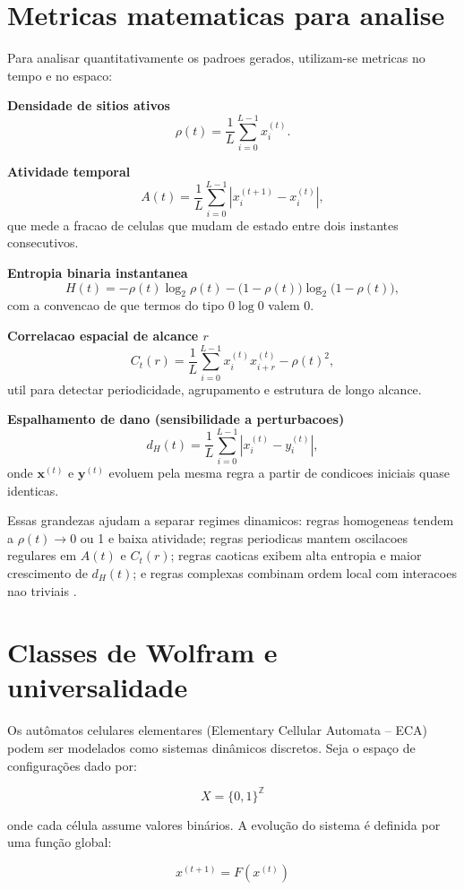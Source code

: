 \section{Metricas matematicas para analise}

Para analisar quantitativamente os padroes gerados, utilizam-se metricas no tempo e no espaco:

\textbf{Densidade de sitios ativos}
\[
\rho(t)=\frac{1}{L}\sum_{i=0}^{L-1} x_i^{(t)}.
\]

\textbf{Atividade temporal}
\[
A(t)=\frac{1}{L}\sum_{i=0}^{L-1}\left|x_i^{(t+1)}-x_i^{(t)}\right|,
\]
que mede a fracao de celulas que mudam de estado entre dois instantes consecutivos.

\textbf{Entropia binaria instantanea}
\[
H(t)=-\rho(t)\log_2\rho(t)-\big(1-\rho(t)\big)\log_2\big(1-\rho(t)\big),
\]
com a convencao de que termos do tipo \(0\log 0\) valem 0.

\textbf{Correlacao espacial de alcance \(r\)}
\[
C_t(r)=\frac{1}{L}\sum_{i=0}^{L-1}x_i^{(t)}x_{i+r}^{(t)}-\rho(t)^2,
\]
util para detectar periodicidade, agrupamento e estrutura de longo alcance.

\textbf{Espalhamento de dano (sensibilidade a perturbacoes)}
\[
d_H(t)=\frac{1}{L}\sum_{i=0}^{L-1}\left|x_i^{(t)}-y_i^{(t)}\right|,
\]
onde \(\mathbf{x}^{(t)}\) e \(\mathbf{y}^{(t)}\) evoluem pela mesma regra a partir de condicoes iniciais quase identicas.

Essas grandezas ajudam a separar regimes dinamicos: regras homogeneas tendem a \(\rho(t)\to 0\) ou 1 e baixa atividade; regras periodicas mantem oscilacoes regulares em \(A(t)\) e \(C_t(r)\); regras caoticas exibem alta entropia e maior crescimento de \(d_H(t)\); e regras complexas combinam ordem local com interacoes nao triviais \cite{wolfram1983,wolfram2002,langton1990,li1990}.

\section{Classes de Wolfram e universalidade}

Os autômatos celulares elementares (Elementary Cellular Automata -- ECA) podem ser modelados como sistemas dinâmicos discretos. Seja o espaço de configurações dado por:

\[
X = \{0,1\}^{\mathbb{Z}}
\]

onde cada célula assume valores binários. A evolução do sistema é definida por uma função global:

\[
x^{(t+1)} = F(x^{(t)})
\]

